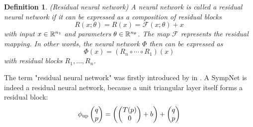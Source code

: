 \documentclass[twoside,a4paper]{article}
\newtheorem{definition}{Definition}
\begin{document}
\begin{definition}
	(Residual neural network)
	A neural network is called a residual neural network
	if it can be expressed as a composition of residual blocks
	\begin{equation*}
		R(x; \theta) = R(x) = \mathcal{F}(x; \theta) + x
	\end{equation*}
	with input $x \in \mathbb{R}^{n_1}$ and parameters $\theta \in \mathbb{R}^{n_\theta}$. 
	The map $\mathcal{F}$ represents the residual mapping.
	In other words, the neural network $\Phi$ then can be expressed as
	\begin{equation*}
		\Phi(x) = (R_n \circ \cdots \circ R_1)(x)
	\end{equation*}
	with residual blocks $R_1, \dots, R_n$.
\end{definition}

The term "residual neural network" was firstly introduced by \citeauthor{resnet2016} in
\cite{resnet2016}. A SympNet is indeed a residual neural network, because a
unit triangular layer itself forms a residual block:
\begin{equation*}
	\phi_{\text{up}} \begin{pmatrix} q \\ p \end{pmatrix} = \left( \begin{pmatrix}
		T(p) \\
		0
	\end{pmatrix} + b \right) + \begin{pmatrix} q \\ p \end{pmatrix}
\end{equation*}
\end{document}
